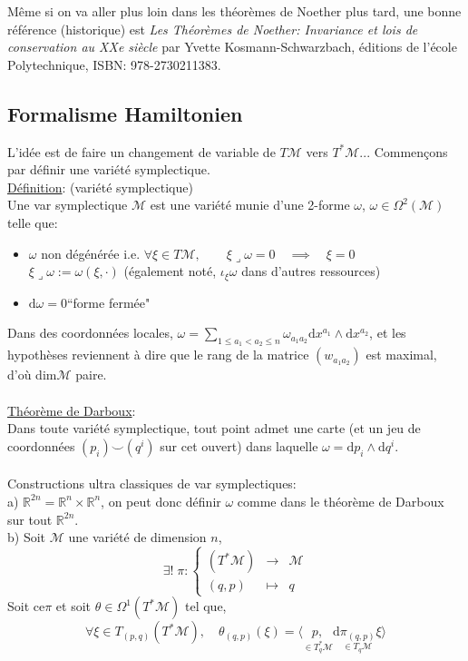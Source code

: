 \documentclass[a4paper,11pt]{article}
\renewcommand{\d}{{\mathrm{d}}}
\begin{document}
Même si on va aller plus loin dans les théorèmes de Noether plus tard, une bonne référence (historique) est \emph{Les Théorèmes de Noether: Invariance et lois de conservation au XXe siècle} par  Yvette Kosmann-Schwarzbach, éditions de l'école Polytechnique, ISBN: 978-2730211383.


\subsection{Formalisme Hamiltonien}
L'idée est de faire un changement de variable de $T\mathcal{M}$ vers $T^*\mathcal{M}$... Commençons par définir une variété symplectique.
\\
\underline{Définition}: (variété symplectique)\\
Une var symplectique $\mathcal{M}$ est une variété munie d'une 2-forme $\omega$, $\omega \in \Omega^2(\mathcal{M})$ telle que:
\begin{itemize}
\item $\omega$ non dégénérée i.e. $\forall \xi\in T\mathcal{M}, \quad \quad \xi \lrcorner \omega = 0 \quad \implies \quad \xi =0$\\
$\xi \lrcorner \omega:= \omega(\xi,\cdot)$ (également noté, $\iota_\xi \omega$ dans d'autres ressources)
\item $\d \omega = 0$\quad\quad ``forme fermée"
\end{itemize}

Dans des coordonnées locales, $\omega = \sum_{1\leq a_1 < a_2\leq n} \omega_{a_1a_2} \d x^{a_1} \wedge \d x^{a_2}$, et les hypothèses reviennent à dire que le rang de la matrice $(w_{a_1a_2})$ est maximal, d'où dim$\mathcal{M}$ paire.\\
\\
\underline{Théorème de Darboux}:\\
Dans toute variété symplectique, tout point admet une carte (et un jeu de coordonnées $(p_i)\!\!\smile\!\!(q^i)$ sur cet ouvert) dans laquelle $\omega = \d p_i\wedge\d q^i$.\\
\\
Constructions ultra classiques de var symplectiques:\\
a) $\mathbb{R}^{2n}=\mathbb{R}^n\times\mathbb{R}^n$, on peut donc définir $\omega$ comme dans le théorème de Darboux sur tout $\mathbb{R}^{2n}$.
\\
b) Soit $\mathcal{M}$ une variété de dimension $n$, 
\begin{equation*}
\exists!\; \pi : \left\{\begin{matrix}
(T^*\mathcal{M}) & \to & \mathcal{M} \\
(q,p) & \mapsto & q
\end{matrix}\right.
\end{equation*}
Soit ce$\pi$ et soit $\theta \in \Omega^1 (T^*\mathcal{M})$ tel que,
$$\forall \xi \in T_{(p,q)}(T^*\mathcal{M}), \quad \theta_{(q,p)}(\xi) = \langle \underset{\in T_q^*\mathcal{M}}{p,} \underset{\in T_q\mathcal{M}}{\d \pi_{(q,p)} \xi} \rangle$$
\end{document}

